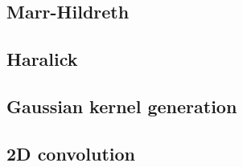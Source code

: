 \documentclass{ipol}
\numberwithin{equation}{section}
\numberwithin{table}{section}
\numberwithin{figure}{section}
\begin{document}
\subsection{Marr-Hildreth}
\label{app:marr-hildreth}


\subsection{Haralick}


\subsection{Gaussian kernel generation}


\subsection{2D convolution}


\end{document}
